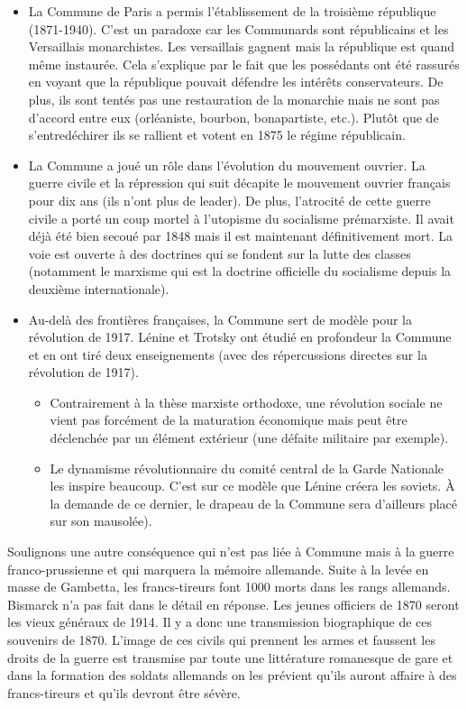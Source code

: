 \documentclass[12pt]{report}
\begin{document}
\begin{itemize}
	\item La Commune de Paris a permis l’établissement de la troisième république (1871-1940).
C’est un paradoxe car les Communards sont républicains et les Versaillais
monarchistes. Les versaillais gagnent mais la république est quand même instaurée.
Cela s'explique par le fait que les possédants ont été rassurés en voyant que la république pouvait défendre les
intérêts conservateurs. 
De plus, ils sont tentés pas une restauration de la monarchie
mais ne sont pas d’accord entre eux (orléaniste, bourbon, bonapartiste, etc.). Plutôt que
de s’entredéchirer ils se rallient et votent en 1875 le régime républicain.
\item La Commune a joué un rôle dans l'évolution du mouvement ouvrier. La guerre civile et la répression qui suit
décapite le mouvement ouvrier français pour dix ans (ils n'ont plus de leader).
De plus, l’atrocité de cette guerre civile a porté un coup mortel à l’utopisme du
socialisme prémarxiste. Il avait déjà été bien secoué par 1848 mais il est
maintenant définitivement mort. La voie est ouverte à des doctrines qui se
fondent sur la lutte des classes (notamment le marxisme qui est la doctrine
officielle du socialisme depuis la deuxième internationale).
\item Au-delà des frontières françaises, la Commune sert de modèle pour la révolution de
1917. Lénine et Trotsky ont étudié en profondeur la Commune et en ont tiré deux
enseignements (avec des répercussions directes sur la révolution de 1917).
\begin{itemize}
\item Contrairement à la thèse marxiste orthodoxe, une révolution sociale ne vient
pas forcément de la maturation économique mais peut être déclenchée par un
élément extérieur (une défaite militaire par exemple).
\item Le dynamisme révolutionnaire du comité central de la Garde Nationale les
inspire beaucoup. C’est sur ce modèle que Lénine créera les soviets. À la
demande de ce dernier, le drapeau de la Commune sera d’ailleurs placé sur son
mausolée).
\end{itemize}
\end{itemize}

Soulignons une autre conséquence qui n’est pas liée à Commune mais à la guerre franco-prussienne et qui marquera la mémoire allemande. Suite à la levée en masse de Gambetta,
les francs-tireurs font 1000 morts dans les rangs allemands. Bismarck n’a pas fait dans le
détail en réponse. Les jeunes officiers de 1870 seront les vieux généraux de 1914. Il y a donc
une transmission biographique de ces souvenirs de 1870. L’image de ces civils qui prennent
les armes et faussent les droits de la guerre est transmise par toute une littérature romanesque
de gare et dans la formation des soldats allemands on les prévient qu’ils auront affaire à des
francs-tireurs et qu’ils devront être sévère.
\end{document}
